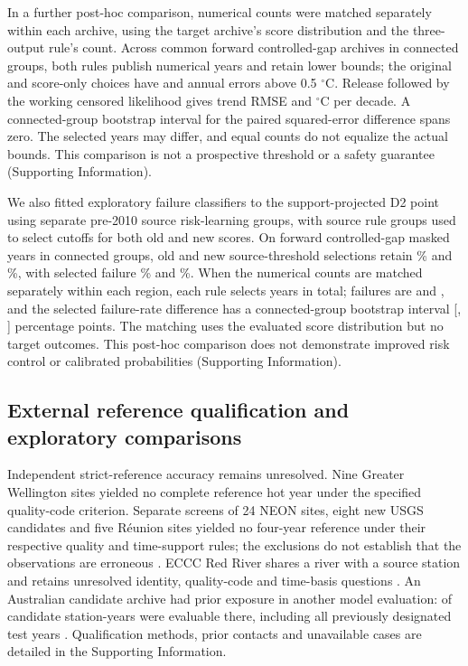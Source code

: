 \documentclass[draft,linenumbers]{agujournal2025}
\begin{document}
In a further post-hoc comparison, numerical counts were matched separately within each archive, using the target archive's score distribution and the three-output rule's count. Across \AMCases{} common forward controlled-gap archives in \AMGroups{} connected groups, both rules publish \AMNumerical{} numerical years and retain \AMBounds{} lower bounds; the original and score-only choices have \AMBadOriginal{} and \AMBadScore{} annual errors above 0.5 $^{\circ}$C. Release followed by the working censored likelihood gives trend RMSE \AMOriginalRMSE{} and \AMScoreRMSE{} $^{\circ}$C per decade. A connected-group bootstrap interval for the paired squared-error difference spans zero. The selected years may differ, and equal counts do not equalize the actual bounds. This comparison is not a prospective threshold or a safety guarantee (Supporting Information).

We also fitted exploratory failure classifiers to the support-projected D2 point using separate pre-2010 source risk-learning groups, with source rule groups used to select cutoffs for both old and new scores. On \PRCases{} forward controlled-gap masked years in \PRGroups{} connected groups, old and new source-threshold selections retain \PROldRetention\% and \PRNewRetention\%, with selected failure \PROldFailure\% and \PRNewFailure\%. When the numerical counts are matched separately within each region, each rule selects \PRMatchedCount{} years in total; failures are \PRMatchedOldBad{} and \PRMatchedNewBad{}, and the selected failure-rate difference has a connected-group bootstrap interval [\PRMatchedLow, \PRMatchedHigh] percentage points. The matching uses the evaluated score distribution but no target outcomes. This post-hoc comparison does not demonstrate improved risk control or calibrated probabilities (Supporting Information).

\subsection{External reference qualification and exploratory comparisons}
Independent strict-reference accuracy remains unresolved. Nine Greater Wellington sites yielded no complete reference hot year under the specified quality-code criterion. Separate screens of 24 NEON sites, eight new USGS candidates and five R\'eunion sites yielded no four-year reference under their respective quality and time-support rules; the exclusions do not establish that the observations are erroneous \cite{greaterwellington2016quality,marzolf2025neon,hubeautemp2026,usgsstatistics2026}. ECCC Red River shares a river with a source station and retains unresolved identity, quality-code and time-basis questions \cite{ecccautomated2024,usgsred2025}. An Australian candidate archive had prior exposure in another model evaluation: \AUFirstEvaluable{} of \AURefYears{} candidate station-years were evaluable there, including all \AUFormerTestEvaluable{} previously designated test years \cite{bom2026}. Qualification methods, prior contacts and unavailable cases are detailed in the Supporting Information.
\end{document}
